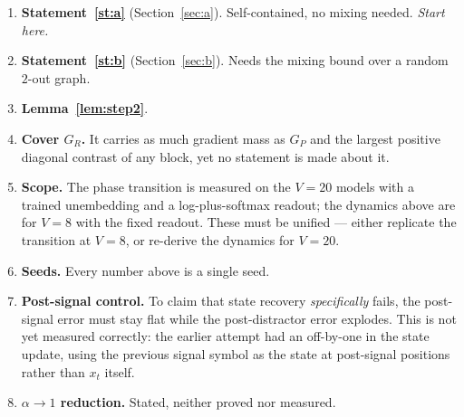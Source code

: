\documentclass[11pt,a4paper]{article}
\theoremstyle{plain}
\theoremstyle{definition}
\newcommand{\1}{\mathbf{1}}
\begin{document}
\begin{enumerate}[nosep]
\item \textbf{Statement~\ref{st:a}} (Section~\ref{sec:a}). Self-contained, no mixing needed.
\emph{Start here.}
\item \textbf{Statement~\ref{st:b}} (Section~\ref{sec:b}). Needs the mixing bound over a random
$2$-out graph.
\item \textbf{Lemma~\ref{lem:step2}}.
\item \textbf{Cover $G_R$.} It carries as much gradient mass as $G_P$ and the largest positive
diagonal contrast of any block, yet no statement is made about it.
\item \textbf{Scope.} The phase transition is measured on the $V=20$ models with a trained
unembedding and a log-plus-softmax readout; the dynamics above are for $V=8$ with the fixed
readout. These must be unified --- either replicate the transition at $V=8$, or re-derive the
dynamics for $V=20$.
\item \textbf{Seeds.} Every number above is a single seed.
\item \textbf{Post-signal control.} To claim that state recovery \emph{specifically} fails, the
post-signal error must stay flat while the post-distractor error explodes. This is not yet
measured correctly: the earlier attempt had an off-by-one in the state update, using the previous
signal symbol as the state at post-signal positions rather than $x_t$ itself.
\item \textbf{$\alpha\to1$ reduction.} Stated, neither proved nor measured.
\end{enumerate}
\end{document}
